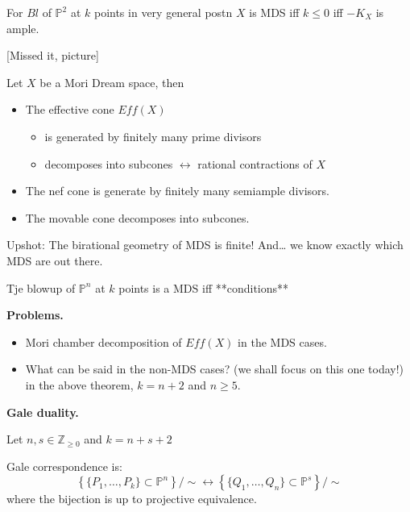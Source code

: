 \begin{theorem}
\label{theorem-batryev-popv04}
For $Bl$ of $\mathbb{P}^2$ at $k$ points
in very general postn
$X $ is MDS iff $k \leq  0$ iff $-K_X$
is ample.
\end{theorem}

\begin{definition}
\label{definition-very-general-position}
[Missed it, picture]
\end{definition}

\begin{theorem}[Hu-Keel, 2000]
\label{theorem-hu-keel}
Let $X$ be a Mori Dream space, then
\begin{itemize}
\item The effective cone $Ef f(X)$
\begin{itemize}
\item is generated by finitely many
prime divisors
\item decomposes into subcones
$\leftrightarrow$ rational 
contractions of $X$
\end{itemize}
\item The nef cone is generate by finitely
many
semiample divisors.
\item The movable cone decomposes into
subcones.
\end{itemize}
\end{theorem}

Upshot:
The birational geometry of MDS is finite!
And… we know exactly which MDS
are out there.

\begin{theorem}
\label{theorem-teve}
Tje blowup of $\mathbb{P}^n$ at $k$ 
points is a MDS iff **conditions**
\end{theorem}

\medskip\noindent
{\bf Problems.} 

\begin{itemize}
\item Mori chamber decomposition of $Ef f(X)$
in the MDS cases.
\item What can be said in the non-MDS cases?
(we shall focus on this one today!)
in the above theorem, $k=n+2$ and 
$n \geq 5$.
\end{itemize}

\medskip\noindent
{\bf Gale duality.} 

\noindent
Let $n, s \in \mathbb{Z}_{\geq 0}$
and $k= n+s+2$

Gale correspondence is:
$$
\left\{ \{P_1,…,P_k\} \subset \mathbb{P}^n
\right\}/\sim
\leftrightarrow
\left\{ \{ Q_1,…,Q_n\} \subset \mathbb{P}^s
\right\}/\sim
$$
where the bijection is up to
projective equivalence.

